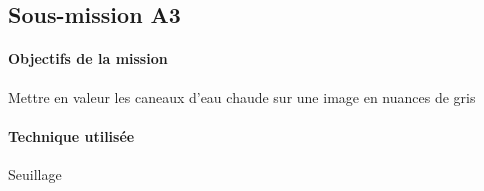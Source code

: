 \subsection{Sous-mission A3}

	\begin{vwcol}[widths={0.65,0.2}, rule=0pt]
	\begin{minipage}{0.7\textwidth}
	\paragraph{Objectifs de la mission}

	Mettre en valeur les caneaux d'eau chaude sur une image en nuances de gris
	\end{minipage}

	\begin{minipage}{0.25\textwidth}
	\begin{flushright}
	\paragraph{Technique utilisée}
	
	Seuillage
	\end{flushright}
	\end{minipage}

	\end{vwcol} 

